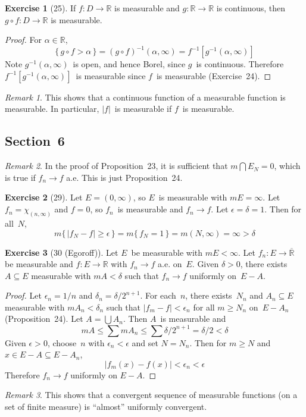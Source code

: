 \documentclass[letterpaper,12pt]{article}
\newcommand{\R}{\mathbb{R}}
\newcommand{\Rex}{\overline{\R}}
\newcommand{\bigunion}{\bigcup}
\newcommand{\bigsect}{\bigcap}
\newcommand{\after}{\circ}
\newcommand{\m}{m}
\newcommand{\abs}[1]{|{#1}|}
\newcommand{\chr}[1]{\chi_{#1}}
\newcommand{\inv}[1]{#1^{-1}}
\theoremstyle{plain}
\theoremstyle{definition}
\newtheorem*{exer}{Exercise}
\theoremstyle{remark}
\newtheorem*{rmk}{Remark}
\begin{document}
\begin{exer}[25]
If \(f:D\to\R\) is measurable and \(g:\R\to\R\) is continuous, then \(g\after f:D\to\R\) is measurable.
\end{exer}
\begin{proof}
For \(\alpha\in\R\),
\[\{\,g\after f>\alpha\,\}=\inv{(g\after f)}(\alpha,\infty)=\inv{f}[\inv{g}(\alpha,\infty)]\]
Note \(\inv{g}(\alpha,\infty)\)~is open, and hence Borel, since \(g\)~is continuous. Therefore \(\inv{f}[\inv{g}(\alpha,\infty)]\)~is measurable since \(f\)~is measurable (Exercise~24).
\end{proof}
\begin{rmk}
This shows that a continuous function of a measurable function is measurable. In particular, \(\abs{f}\)~is measurable if \(f\)~is measurable.
\end{rmk}

\subsection*{Section~6}
\begin{rmk}
In the proof of Proposition~23, it is sufficient that \(\m\bigsect E_N=0\), which is true if \(f_n\to f\) a.e. This is just Proposition~24.
\end{rmk}

\begin{exer}[29]
Let \(E=(0,\infty)\), so \(E\)~is measurable with \(\m E=\infty\). Let \(f_n=\chr{(n,\infty)}\) and \(f=0\), so \(f_n\)~is measurable and \(f_n\to f\). Let \(\epsilon=\delta=1\). Then for all~\(N\),
\[\m\{\,\abs{f_N-f}\ge\epsilon\,\}=\m\{\,f_N=1\,\}=\m(N,\infty)=\infty>\delta\]
\end{exer}

\begin{exer}[30 (Egoroff)]
Let \(E\)~be measurable with \(\m E<\infty\). Let \(f_n:E\to\Rex\) be measurable and \(f:E\to\R\) with \(f_n\to f\) a.e. on~\(E\). Given \(\delta>0\), there exists \(A\subseteq E\) measurable with \(\m A<\delta\) such that \(f_n\to f\) uniformly on~\(E-A\).
\end{exer}
\begin{proof}
Let \(\epsilon_n=1/n\) and \(\delta_n=\delta/2^{n+1}\). For each~\(n\), there exists~\(N_n\) and \(A_n\subseteq E\) measurable with \(\m A_n<\delta_n\) such that \(\abs{f_m-f}<\epsilon_n\) for all \(m\ge N_n\) on~\(E-A_n\) (Proposition~24). Let \(A=\bigunion A_n\). Then \(A\)~is measurable and
\[\m A\le\sum\m A_n\le\sum\delta/2^{n+1}=\delta/2<\delta\]
Given \(\epsilon>0\), choose~\(n\) with \(\epsilon_n<\epsilon\) and set \(N=N_n\). Then for \(m\ge N\) and \(x\in E-A\subseteq E-A_n\),
\[\abs{f_m(x)-f(x)}<\epsilon_n<\epsilon\]
Therefore \(f_n\to f\) uniformly on \(E-A\).
\end{proof}
\begin{rmk}
This shows that a convergent sequence of measurable functions (on a set of finite measure) is ``almost'' uniformly convergent.
\end{rmk}
\end{document}
